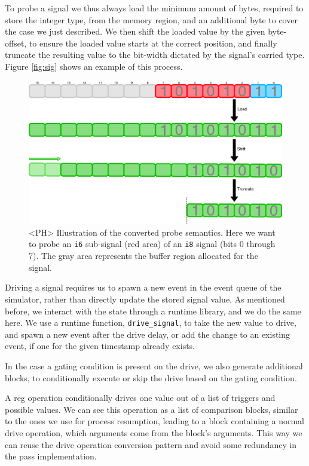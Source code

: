 To probe a signal we thus always load the minimum amount of bytes, required to store the integer type, from the memory region, and an additional byte to cover the case we just described. We then shift the loaded value by the given byte-offset, to ensure the loaded value starts at the correct position, and finally truncate the resulting value to the bit-width dictated by the signal's carried type. Figure \ref{fig:sig} shows an example of this process.

\begin{figure}[ht]
    \includegraphics[width=\textwidth]{gfx/Probe.png}
    \caption[<PH> Illustration of the converted probe semantics.]{<PH> Illustration of the converted probe semantics. Here we want to probe an \texttt{i6} sub-signal (red area) of an \texttt{i8} signal (bits $0$
        through $7$). The gray area represents the buffer region allocated for the signal.}
    \label{fig:prb}
\end{figure}

Driving a signal requires us to spawn a new event in the event queue of the simulator, rather than directly update the stored signal value. As mentioned before, we interact with the state through a runtime library, and we do the same here. We use a runtime function, \texttt{drive\_signal}, to take the new value to drive, and spawn a new event after the drive delay, or add the change to an existing event, if one for the given timestamp already exists.

In the case a gating condition is present on the drive, we also generate additional blocks, to conditionally execute or skip the drive based on the gating condition.

A reg operation conditionally drives one value out of a list of triggers and possible values. We can see this operation as a list of comparison blocks, similar to the ones we use for process resumption, leading to a block containing a normal drive operation, which arguments come from the block's arguments. This way we can reuse the drive operation conversion pattern and avoid some redundancy in the pass implementation.

